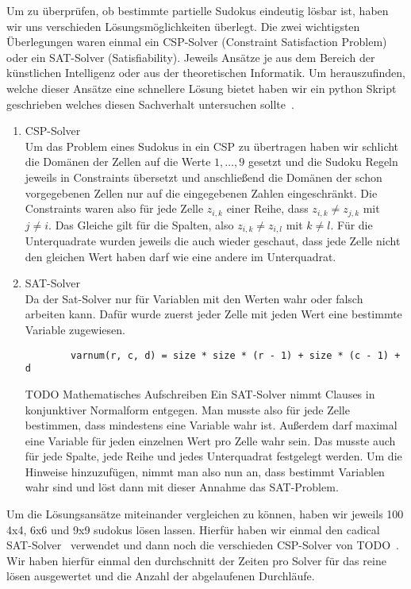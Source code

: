 \documentclass[12pt,a4paper]{article}
\begin{document}
Um zu überprüfen, ob bestimmte partielle Sudokus eindeutig lösbar ist, haben wir uns verschieden Lösungsmöglichkeiten überlegt.
Die zwei wichtigsten Überlegungen waren einmal ein CSP-Solver (Constraint Satisfaction Problem) oder ein SAT-Solver (Satisfiability).
Jeweils Ansätze je aus dem Bereich der künstlichen Intelligenz oder aus der theoretischen Informatik.
Um herauszufinden, welche dieser Ansätze eine schnellere Lösung bietet haben wir ein python Skript geschrieben welches diesen Sachverhalt untersuchen sollte~\cite{TODO}.
\begin{enumerate}
    \item CSP-Solver \\
    Um das Problem eines Sudokus in ein CSP zu übertragen haben wir schlicht die Domänen der Zellen auf die Werte $1, \dots, 9$ gesetzt und die Sudoku Regeln jeweils in Constraints übersetzt und anschließend die Domänen der schon vorgegebenen Zellen nur auf die eingegebenen Zahlen eingeschränkt.
    Die Constraints waren also für jede Zelle $z_{i, k}$ einer Reihe, dass $z_{i, k} \neq z_{j, k}$ mit $j \neq i$.
    Das Gleiche gilt für die Spalten, also $z_{i, k} \neq z_{i, l}$ mit $k \neq l$.
    Für die Unterquadrate wurden jeweils die auch wieder geschaut, dass jede Zelle nicht den gleichen Wert haben darf wie eine andere im Unterquadrat.
    \item SAT-Solver \\
    Da der Sat-Solver nur für Variablen mit den Werten wahr oder falsch arbeiten kann.
    Dafür wurde zuerst jeder Zelle mit jeden Wert eine bestimmte Variable zugewiesen.
    \begin{verbatim}
        varnum(r, c, d) = size * size * (r - 1) + size * (c - 1) + d
    \end{verbatim}
    TODO Mathematisches Aufschreiben
    Ein SAT-Solver nimmt Clauses in konjunktiver Normalform entgegen.
    Man musste also für jede Zelle bestimmen, dass mindestens eine Variable wahr ist.
    Außerdem darf maximal eine Variable für jeden einzelnen Wert pro Zelle wahr sein.
    Das musste auch für jede Spalte, jede Reihe und jedes Unterquadrat festgelegt werden.
    Um die Hinweise hinzuzufügen, nimmt man also nun an, dass bestimmt Variablen wahr sind und löst dann mit dieser Annahme das SAT-Problem.
\end{enumerate}

Um die Lösungsansätze miteinander vergleichen zu können, haben wir jeweils 100 4x4, 6x6 und 9x9 sudokus lösen lassen.
Hierfür haben wir einmal den cadical SAT-Solver~\cite{TODO} verwendet und dann noch die verschieden CSP-Solver von TODO~\cite{TODO}.
Wir haben hierfür einmal den durchschnitt der Zeiten pro Solver für das reine lösen ausgewertet und die Anzahl der abgelaufenen Durchläufe.
\end{document}
